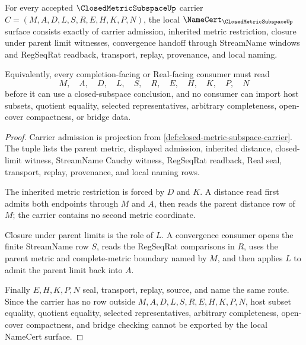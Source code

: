 \begin{theorem}
\label{thm:closed-metric-subspace-namecert-obligations}
For every accepted $\ClosedMetricSubspaceUp$ carrier $C=(M,A,D,L,S,R,E,H,K,P,N)$, the local $\NameCert_{\ClosedMetricSubspaceUp}$ surface consists exactly of carrier admission, inherited metric restriction, closure under parent limit witnesses, convergence handoff through StreamName windows and RegSeqRat readback, transport, replay, provenance, and local naming.

Equivalently, every completion-facing or Real-facing consumer must read
$$
M,\quad A,\quad D,\quad L,\quad S,\quad R,\quad E,\quad H,\quad K,\quad P,\quad N
$$
before it can use a closed-subspace conclusion, and no consumer can import host subsets, quotient equality, selected representatives, arbitrary completeness, open-cover compactness, or bridge data.
\end{theorem}
\begin{proof}
Carrier admission is projection from \autoref{def:closed-metric-subspace-carrier}. The tuple lists the parent metric, displayed admission, inherited distance, closed-limit witness, StreamName Cauchy witness, RegSeqRat readback, Real seal, transport, replay, provenance, and local naming rows.

The inherited metric restriction is forced by $D$ and $K$. A distance read first admits both endpoints through $M$ and $A$, then reads the parent distance row of $M$; the carrier contains no second metric coordinate.

Closure under parent limits is the role of $L$. A convergence consumer opens the finite StreamName row $S$, reads the RegSeqRat comparisons in $R$, uses the parent metric and complete-metric boundary named by $M$, and then applies $L$ to admit the parent limit back into $A$.

Finally $E,H,K,P,N$ seal, transport, replay, source, and name the same route. Since the carrier has no row outside $M,A,D,L,S,R,E,H,K,P,N$, host subset equality, quotient equality, selected representatives, arbitrary completeness, open-cover compactness, and bridge checking cannot be exported by the local NameCert surface.
\end{proof}


